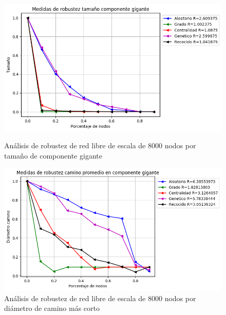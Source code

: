 \begin{figure}[!htb]
    \begin{minipage}{0.48\textwidth}
        \centering
        \includegraphics[scale=0.4]{CapituloAAnexos/imagenesAnexoC/Robustez/grafica_GC20180512_143117ScaleFree8000Nodes}
        \caption{Análisis de robustez de red libre de escala de 8000 nodos por tamaño de componente gigante}
    \end{minipage}\hfill
   \begin{minipage}{0.48\textwidth}
         \centering
       \includegraphics[scale=0.4]{CapituloAAnexos/imagenesAnexoC/Robustez/grafica_APL20180512_143117ScaleFree8000Nodes}
        \caption{Análisis de robustez de red libre de escala de 8000 nodos por diámetro de camino más corto}
    \end{minipage}
\end{figure}



